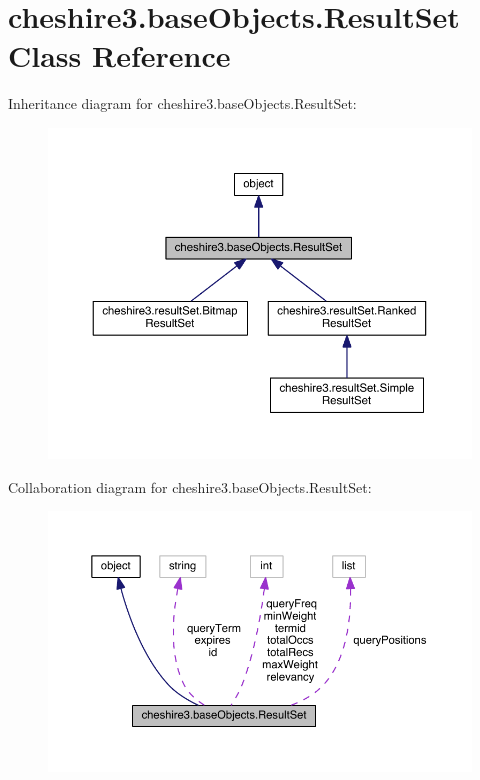 \hypertarget{classcheshire3_1_1base_objects_1_1_result_set}{\section{cheshire3.\-base\-Objects.\-Result\-Set Class Reference}
\label{classcheshire3_1_1base_objects_1_1_result_set}
}


Inheritance diagram for cheshire3.\-base\-Objects.\-Result\-Set\-:
\nopagebreak
\begin{figure}[H]
\begin{center}
\leavevmode
\includegraphics[width=350pt]{classcheshire3_1_1base_objects_1_1_result_set__inherit__graph}
\end{center}
\end{figure}


Collaboration diagram for cheshire3.\-base\-Objects.\-Result\-Set\-:
\nopagebreak
\begin{figure}[H]
\begin{center}
\leavevmode
\includegraphics[width=350pt]{classcheshire3_1_1base_objects_1_1_result_set__coll__graph}
\end{center}
\end{figure}
